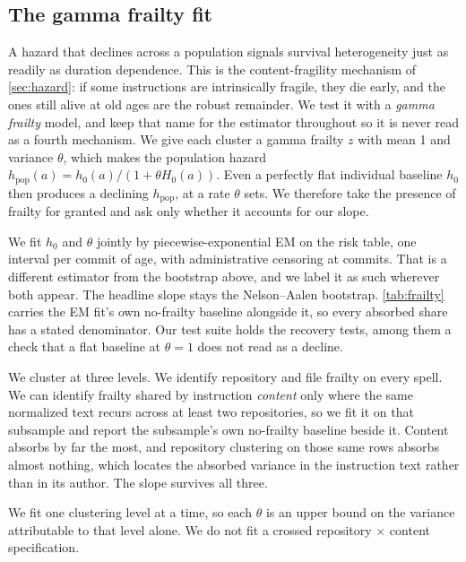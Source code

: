 \subsection{The gamma frailty fit}
\label{sec:appendix:frailty}



A hazard that declines across a population signals survival heterogeneity just as readily as
duration dependence. This is the content-fragility mechanism of \autoref{sec:hazard}: if some
instructions are intrinsically fragile, they die early, and the ones still alive at old ages are
the robust remainder. We test it with a \emph{gamma frailty} model, and keep that name for the
estimator throughout so it is never read as a fourth mechanism. We give each cluster a gamma
frailty $z$ with mean 1 and variance $\theta$, which makes the population hazard
$h_{\text{pop}}(a) = h_0(a) / (1 + \theta H_0(a))$. Even a perfectly flat individual baseline
$h_0$ then produces a declining $h_{\text{pop}}$, at a rate $\theta$ sets. We therefore take the
presence of frailty for granted and ask only whether it accounts for our slope.

We fit $h_0$ and $\theta$ jointly by piecewise-exponential EM on the risk table, one interval per
commit of age, with administrative censoring at \HazardAgeMax{} commits. That is a different
estimator from the bootstrap above, and we label it as such wherever both appear. The headline
slope stays the Nelson--Aalen bootstrap. \autoref{tab:frailty} carries the EM fit's own no-frailty
baseline alongside it, so every absorbed share has a stated denominator. Our test suite holds the
recovery tests, among them a check that a flat baseline at $\theta = 1$ does not read as a
decline.

We cluster at three levels. We identify repository and file frailty on every spell. We can identify
frailty shared by instruction \emph{content} only where the same normalized text recurs across at
least two repositories, so we fit it on that subsample and report the subsample's own no-frailty
baseline beside it. Content absorbs by far the most, and repository clustering on those same rows
absorbs almost nothing, which locates the absorbed variance in the instruction text rather than in
its author. The slope survives all three.

We fit one clustering level at a time, so each $\theta$ is an upper bound on the variance
attributable to that level alone. We do not fit a crossed repository $\times$ content
specification.

